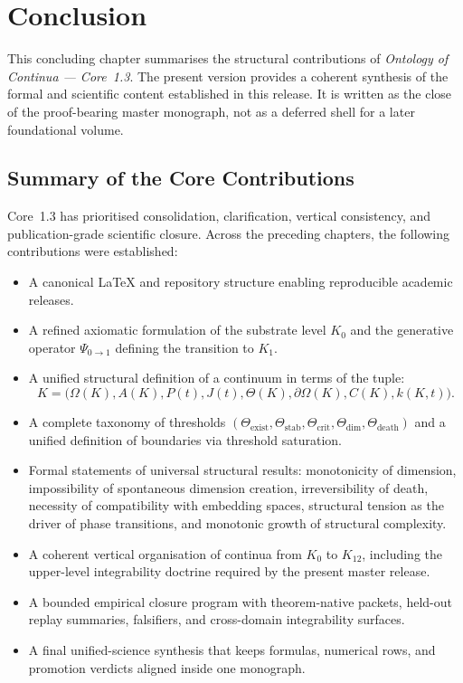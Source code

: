 
\section{Conclusion}
\label{sec:conclusion}

This concluding chapter summarises the structural contributions of
\emph{Ontology of Continua --- Core~1.3}. The present version provides a
coherent synthesis of the formal and scientific content established in this
release. It is written as the close of the proof-bearing master monograph,
not as a deferred shell for a later foundational volume.

\subsection{Summary of the Core Contributions}

Core~1.3 has prioritised consolidation, clarification, vertical consistency,
and publication-grade scientific closure.
Across the preceding chapters, the following contributions were established:

\begin{itemize}
    \item A canonical \LaTeX{} and repository structure enabling reproducible academic releases.
    \item A refined axiomatic formulation of the substrate level \(K_0\) and the generative operator 
          \(\Psi_{0\to 1}\) defining the transition to \(K_1\).
    \item A unified structural definition of a continuum in terms of the tuple:
          \[
              K = \big(\Omega(K), A(K), P(t), J(t), \Theta(K), \partial\Omega(K), C(K), k(K,t)\big).
          \]
    \item A complete taxonomy of thresholds 
          \((\Theta_{\mathrm{exist}}, \Theta_{\mathrm{stab}}, \Theta_{\mathrm{crit}}, 
            \Theta_{\mathrm{dim}}, \Theta_{\mathrm{death}})\) 
          and a unified definition of boundaries via threshold saturation.
    \item Formal statements of universal structural results:
          monotonicity of dimension,
          impossibility of spontaneous dimension creation,
          irreversibility of death,
          necessity of compatibility with embedding spaces,
          structural tension as the driver of phase transitions,
          and monotonic growth of structural complexity.
    \item A coherent vertical organisation of continua from \(K_0\) to \(K_{12}\),  
          including the upper-level integrability doctrine required by the present master release.
    \item A bounded empirical closure program with theorem-native packets, held-out replay summaries, falsifiers, and cross-domain integrability surfaces.
    \item A final unified-science synthesis that keeps formulas, numerical rows, and promotion verdicts aligned inside one monograph.
\end{itemize}

